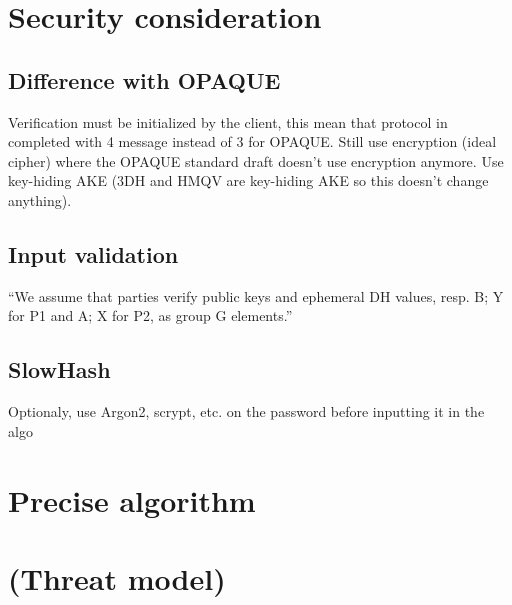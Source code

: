 \documentclass[../report.tex]{subfiles}
\begin{document}
\section{Security consideration}

\subsection{Difference with OPAQUE} %

Verification must be initialized by the client, this mean that protocol in completed with 4 message instead of 3 for OPAQUE.
Still use encryption (ideal cipher) where the OPAQUE standard draft doesn't use encryption anymore.
Use key-hiding AKE (3DH and HMQV are key-hiding AKE so this doesn't change anything).

\subsection{Input validation}
``We assume that parties verify public keys and ephemeral DH values, resp.
B; Y for P1 and A; X for P2, as group G elements.''

\subsection{SlowHash}
Optionaly, use Argon2, scrypt, etc. on the password before inputting it in the algo


\section{Precise algorithm}

\section{(Threat model)}
\end{document}
